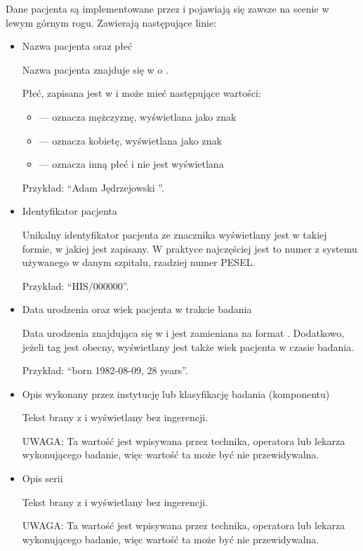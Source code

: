 Dane pacjenta są implementowane przez  i pojawiają się zawsze na scenie w lewym górnym rogu.
Zawierają następujące linie:
\begin{itemize}
    \item Nazwa pacjenta oraz płeć

          Nazwa pacjenta znajduje się w  o .

          Płeć, zapisana jest w  i może mieć następujące wartości:
          \begin{itemize}
              \item {} --- oznacza mężczyznę, wyświetlana jako znak \utfMaleSign
              \item {} --- oznacza kobietę, wyświetlana jako znak \utfFemaleSign
              \item {} --- oznacza inną płeć i nie jest wyświetlana
          \end{itemize}

          Przykład: \enquote{Adam Jędrzejowski \utfMaleSign}.

    \item Identyfikator pacjenta

          Unikalny identyfikator pacjenta ze znacznika  wyświetlany jest w takiej formie, w jakiej jest zapisany.
          W praktyce najczęściej jest to numer z systemu używanego w danym szpitalu, rzadziej numer PESEL.

          Przykład: \enquote{HIS/000000}.

    \item Data urodzenia oraz wiek pacjenta w trakcie badania

          Data urodzenia znajdująca się w  i jest zamieniana na format .
          Dodatkowo, jeżeli tag  jest obecny, wyświetlany jest także wiek pacjenta w czasie badania.

          Przykład: \enquote{born 1982-08-09, 28 years}.

    \item Opis wykonany przez instytucję lub klasyfikację badania (komponentu)

          Tekst brany z  i wyświetlany bez ingerencji.

          UWAGA: Ta wartość jest wpisywana przez technika, operatora lub lekarza wykonującego badanie, więc wartość ta może być nie przewidywalna.

    \item Opis serii

          Tekst brany z  i wyświetlany bez ingerencji.

          UWAGA: Ta wartość jest wpisywana przez technika, operatora lub lekarza wykonującego badanie, więc wartość ta może być nie przewidywalna.
\end{itemize}

